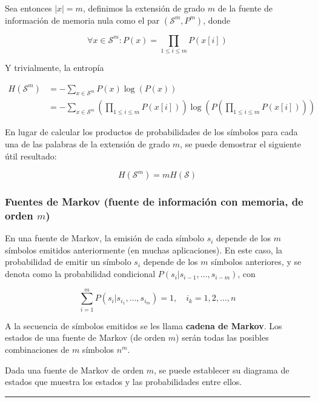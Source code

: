 Sea entonces \(|x|=m\), definimos la extensión de grado \(m\) de la
fuente de información de memoria nula como el par
\(\left(\mathcal{S}^m, P^m\right)\), donde

\[
\forall x\in\mathcal{S}^m:P(x)=\prod_{1\leq i\leq m}P(x[i])
\]

Y trivialmente, la entropía


\begin{align*}
H\left(\mathcal{S}^m\right)&=-\sum_{x\in\mathcal{S}^m}P(x)\log\left(P(x)\right)\\
&=-\sum_{x\in\mathcal{S}^m}\left(\prod_{1\leq i\leq m}P(x[i])\right)\log\left(P(\prod_{1\leq i\leq m}P(x[i]))\right)
\end{align*}


En lugar de calcular los productos de probabilidades de los símbolos
para cada una de las palabras de la extensión de grado \(m\), se puede
demostrar el siguiente útil resultado:

\[
H\left(\mathcal{S}^m\right)=mH(\mathcal{S})
\]

\subsubsection{\texorpdfstring{Fuentes de Markov (fuente de información
con memoria, de orden
\(m\))}{Fuentes de Markov (fuente de información con memoria, de orden m)}}\label{fuentes-de-markov-fuente-de-informaciuxf3n-con-memoria-de-orden-m}

En una fuente de Markov, la emisión de cada símbolo \(s_i\) depende de
los \(m\) símbolos emitidos anteriormente (en muchas aplicaciones). En
este caso, la probabilidad de emitir un símbolo \(s_i\) depende de los
\(m\) símbolos anteriores, y se denota como la probabilidad condicional
\(P(s_i|s_{i-1},\ldots,s_{i-m})\), con

\[
\sum_{i=1}^{m}P(s_i|s_{i_1},\ldots,s_{i_m})= 1,\quad i_k = 1,2,\dots,n
\]

A la secuencia de símbolos emitidos se les llama \textbf{cadena de
Markov}. Los estados de una fuente de Markov (de orden \(m\)) serán
todas las posibles combinaciones de \(m\) símbolos \(n^m\).

Dada una fuente de Markov de orden \(m\), se puede establecer su
diagrama de estados que muestra los estados y las probabilidades entre
ellos.

\begin{center}\rule{0.5\linewidth}{0.5pt}\end{center}

